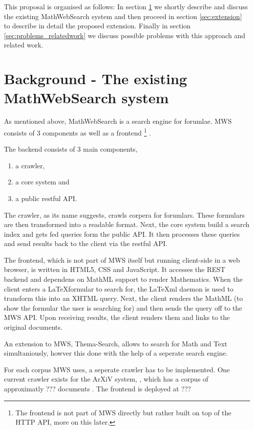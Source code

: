 \documentclass[11pt]{article}
\begin{document}
This proposal is organised as follows: In section \ref{sec:mws} we shortly describe and discuss the existing MathWebSearch system and then proceed in section \ref{sec:extension} to describe in detail the proposed extension. Finally in section \ref{sec:problems_relatedwork} we discuss possible problems with this approach and related work.

\section{Background - The existing MathWebSearch system}
\label{sec:mws}

As mentioned above, MathWebSearch is a search engine for forumlae. MWS consists of 3 components as well as a frontend \footnote{The frontend is not part of MWS directly but rather built on top of the HTTP API, more on this later. } \cite{KohPro:MWSmanual}.

The backend consists of 3 main components,
\begin{enumerate}
  \item a crawler,
  \item a core system and
  \item a public restful API.
\end{enumerate}

The crawler, as its name suggests, crawls corpera for forumlars. These formulars are then transformed into a readable format. Next, the core system build a search index and gets fed queries form the public API. It then processes these queries and send results back to the client via the restful API.

The frontend, which is not part of MWS itself but running client-side in a web browser, is written in HTML5, CSS and JavaScript. It accesses the REST backend and dependens on MathML support to render Mathematics. When the client enters a \LaTeX formular to search for, the \LaTeX{}ml daemon \cite{latexml-daemon} is used to transform this into an XHTML query. Next, the client renders the MathML (to show the formular the user is searching for) and then sends the query off to the MWS API. Upon receiving results, the client renders them and links to the original documents.

An extension to MWS, Thema-Search,  allows to search for Math and Text simultaniously, howver this done with the help of a seperate search engine.

For each corpus MWS uses, a seperate crawler has to be implemented. One current crawler exists for the ArXiV system, , which has a corpus of approximatly ??? documents . The frontend is deployed at ??? 
\end{document}
